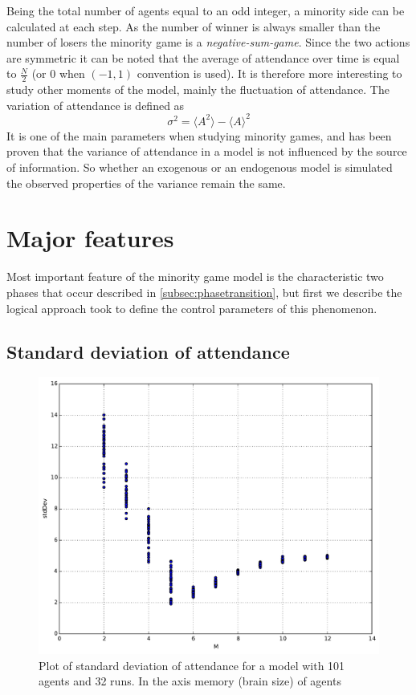 Being the total number of agents equal to an odd integer, a minority side can be calculated at each step.
As the number of winner is always smaller than the number of losers the minority game is a \textit{negative-sum-game}.
Since the two actions are symmetric it can be noted that the average of attendance over time is equal to $\frac{N}{2}$ (or $0$ when $(-1,1)$ convention is used).
It is therefore more interesting to study other moments of the model, mainly the fluctuation of attendance.
The variation of attendance is defined as
\begin{displaymath}
\sigma^2 = \langle A^2 \rangle - \langle A \rangle^2
\end{displaymath}
It is one of the main parameters when studying minority games, and has been proven that the variance of attendance in a model is not influenced by the source of information.
So whether an exogenous or an endogenous model is simulated the observed properties of the variance remain the same.

\section{Major features}
\label{miinority:majorfeatures}
Most important feature of the minority game model  is the characteristic two phases that occur described in \ref{subsec:phasetransition}, but first we describe the logical approach took to define the control parameters of this phenomenon.

\subsection{Standard deviation of attendance}
\label{subsec:stddev}



\begin{figure}
\begin{center}
\includegraphics[scale=0.4]{images/minority/memory_to_stddev.pdf}
\caption{Plot of standard deviation of attendance for a model with 101 agents and 32 runs. In the axis memory (brain size) of agents}
\label{fig:memory to stddev}
\end{center}
\end{figure}

